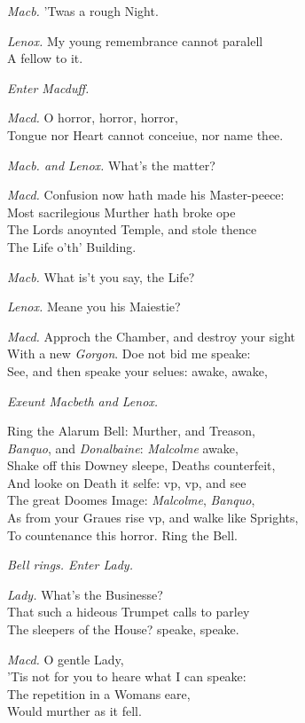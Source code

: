\documentclass[12pt]{sides}
\newcommand{\clStageDir}[1]{\hspace*{\fill}\textit{#1}\hspace*{\fill}}
\newcommand{\elStageDir}[1]{\hfill\textit{#1}}
\newcommand{\dia}[1]{\hskip 15pt\textit{#1}\hskip 6pt}
\begin{document}
\begin{multicols}{2}
            \dia{Macb.} 'Twas a rough Night. %

            \dia{Lenox.} My young remembrance cannot paralell \\ A fellow to it.

            \clStageDir{Enter Macduff.}

            \dia{Macd.} O horror, horror, horror, \\ Tongue nor Heart cannot conceiue, nor name thee.

            \dia{Macb. and Lenox.} What's the matter?

            \dia{Macd.} Confusion now hath made his Master-peece: \\ Most sacrilegious Murther hath broke ope \\ The Lords anoynted Temple, and stole thence \\ The Life o'th' Building.

            \dia{Macb.} What is't you say, the Life?

            \dia{Lenox.} Meane you his Maiestie?

            \dia{Macd.} Approch the Chamber, and destroy your sight \\ With a new \textit{Gorgon}. Doe not bid me speake: \\ See, and then speake your selues: awake, awake,

            \elStageDir{Exeunt Macbeth and Lenox.}

            Ring the Alarum Bell: Murther, and Treason, \\ \textit{Banquo}, and \textit{Donalbaine}: \textit{Malcolme} awake, \\ Shake off this Downey sleepe, Deaths counterfeit, \\ And looke on Death it selfe: vp, vp, and see \\ The great Doomes Image: \textit{Malcolme}, \textit{Banquo}, \\ As from your Graues rise vp, and walke like Sprights, \\ To countenance this horror. Ring the Bell.

            \clStageDir{Bell rings. Enter Lady.}

            \dia{Lady.} What's the Businesse? \\ That such a hideous Trumpet calls to parley \\ The sleepers of the House? speake, speake.

            \dia{Macd.} O gentle Lady, \\ 'Tis not for you to heare what I can speake: \\ The repetition in a Womans eare, \\ Would murther as it fell.


\end{multicols}
\end{document}
